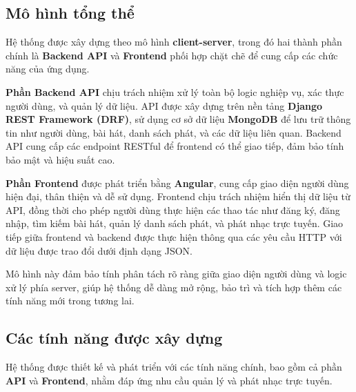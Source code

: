 \subsection{Mô hình tổng thể}
Hệ thống được xây dựng theo mô hình \textbf{client-server}, trong đó hai thành phần chính là \textbf{Backend API} và \textbf{Frontend} phối hợp chặt chẽ để cung cấp các chức năng của ứng dụng. 

\textbf{Phần Backend API} chịu trách nhiệm xử lý toàn bộ logic nghiệp vụ, xác thực người dùng, và quản lý dữ liệu. API được xây dựng trên nền tảng \textbf{Django REST Framework (DRF)}, sử dụng cơ sở dữ liệu \textbf{MongoDB} để lưu trữ thông tin như người dùng, bài hát, danh sách phát, và các dữ liệu liên quan. Backend API cung cấp các endpoint RESTful để frontend có thể giao tiếp, đảm bảo tính bảo mật và hiệu suất cao.

\textbf{Phần Frontend} được phát triển bằng \textbf{Angular}, cung cấp giao diện người dùng hiện đại, thân thiện và dễ sử dụng. Frontend chịu trách nhiệm hiển thị dữ liệu từ API, đồng thời cho phép người dùng thực hiện các thao tác như đăng ký, đăng nhập, tìm kiếm bài hát, quản lý danh sách phát, và phát nhạc trực tuyến. Giao tiếp giữa frontend và backend được thực hiện thông qua các yêu cầu HTTP với dữ liệu được trao đổi dưới định dạng JSON.

Mô hình này đảm bảo tính phân tách rõ ràng giữa giao diện người dùng và logic xử lý phía server, giúp hệ thống dễ dàng mở rộng, bảo trì và tích hợp thêm các tính năng mới trong tương lai.

\subsection{Các tính năng được xây dựng}
Hệ thống được thiết kế và phát triển với các tính năng chính, bao gồm cả phần \textbf{API} và \textbf{Frontend}, nhằm đáp ứng nhu cầu quản lý và phát nhạc trực tuyến.


